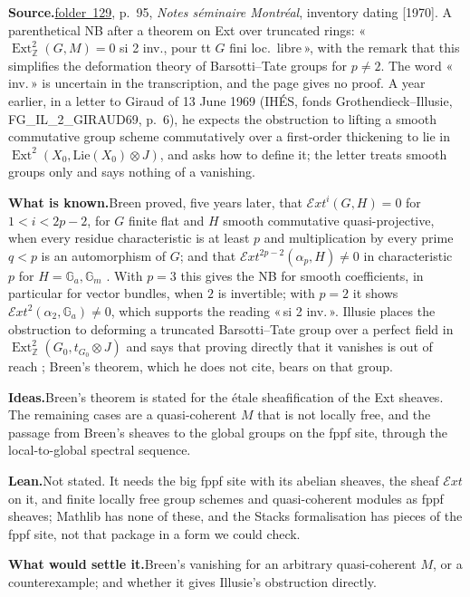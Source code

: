 \documentclass[11pt]{article}
\newcommand{\q}[1]{«\,#1\,»}
\newcommand{\fac}[1]{\href{https://grothendieck.umontpellier.fr/#1.pdf}{folder~#1}}
\newcommand{\Ext}{\operatorname{Ext}}
\theoremstyle{definition}
\theoremstyle{plain}\newtheorem*{proposition}{Proposition}\theoremstyle{definition}
\newcommand{\entry}[1]{\par\medskip\noindent\textbf{#1}\enspace}
\newcommand{\src}[1]{\entry{Source.}#1}
\newcommand{\known}{\entry{What is known.}}
\newcommand{\ideas}{\entry{Ideas.}}
\newcommand{\leanst}{\entry{Lean.}}
\newcommand{\settle}{\entry{What would settle it.}}
\begin{document}
\src{\fac{129}, p.~95, \emph{Notes séminaire Montréal}, inventory dating [1970]. A parenthetical NB after a theorem on Ext over truncated rings: \q{$\Ext^2_{\mathbb Z}(G, M) = 0$ si 2 inv., pour tt $G$ fini loc.\ libre}, with the remark that this simplifies the deformation theory of Barsotti--Tate groups for $p \ne 2$. The word \q{inv.} is uncertain in the transcription, and the page gives no proof. A year earlier, in a letter to Giraud of 13 June 1969 (IHÉS, fonds Grothendieck--Illusie, FG\_IL\_2\_GIRAUD69, p.~6), he expects the obstruction to lifting a smooth commutative group scheme commutatively over a first-order thickening to lie in $\Ext^2(X_0, \mathrm{Lie}(X_0) \otimes J)$, and asks how to define it; the letter treats smooth groups only and says nothing of a vanishing.}

\known Breen proved, five years later, that $\mathcal Ext^i(G, H) = 0$ for $1 < i < 2p-2$, for $G$ finite flat and $H$ smooth commutative quasi-projective, when every residue characteristic is at least $p$ and multiplication by every prime $q < p$ is an automorphism of $G$; and that $\mathcal Ext^{2p-2}(\alpha_p, H) \ne 0$ in characteristic~$p$ for $H = \mathbb G_a, \mathbb G_m$ \cite{breen1975}. With $p = 3$ this gives the NB for smooth coefficients, in particular for vector bundles, when $2$ is invertible; with $p = 2$ it shows $\mathcal Ext^2(\alpha_2, \mathbb G_a) \ne 0$, which supports the reading \q{si 2 inv.}. Illusie places the obstruction to deforming a truncated Barsotti--Tate group over a perfect field in $\Ext^2_{\mathbb Z}(G_0, t_{G_0} \otimes J)$ and says that proving directly that it vanishes is out of reach \cite[p.~2]{illusie2023}; Breen's theorem, which he does not cite, bears on that group.

\ideas Breen's theorem is stated for the étale sheafification of the Ext sheaves. The remaining cases are a quasi-coherent $M$ that is not locally free, and the passage from Breen's sheaves to the global groups on the fppf site, through the local-to-global spectral sequence.

\leanst Not stated. It needs the big fppf site with its abelian sheaves, the sheaf $\mathcal Ext$ on it, and finite locally free group schemes and quasi-coherent modules as fppf sheaves; Mathlib has none of these, and the Stacks formalisation \cite{axiomstacks} has pieces of the fppf site, not that package in a form we could check.

\settle Breen's vanishing for an arbitrary quasi-coherent $M$, or a counterexample; and whether it gives Illusie's obstruction directly.
\end{document}
